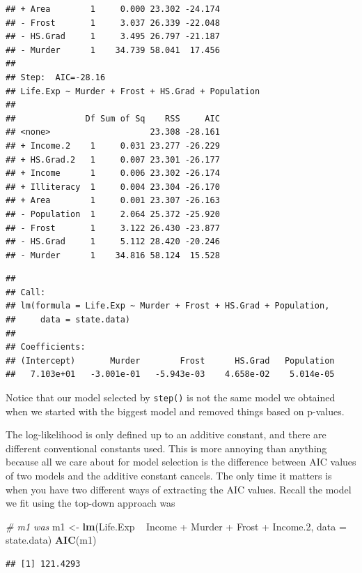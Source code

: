 \documentclass[]{book}
\newenvironment{Shaded}{\begin{snugshade}}{\end{snugshade}}
\newcommand{\KeywordTok}[1]{\textcolor[rgb]{0.13,0.29,0.53}{\textbf{{#1}}}}
\newcommand{\DataTypeTok}[1]{\textcolor[rgb]{0.13,0.29,0.53}{{#1}}}
\newcommand{\FloatTok}[1]{\textcolor[rgb]{0.00,0.00,0.81}{{#1}}}
\newcommand{\StringTok}[1]{\textcolor[rgb]{0.31,0.60,0.02}{{#1}}}
\newcommand{\CommentTok}[1]{\textcolor[rgb]{0.56,0.35,0.01}{\textit{{#1}}}}
\newcommand{\NormalTok}[1]{{#1}}
\theoremstyle{definition}
\theoremstyle{definition}
\theoremstyle{remark}
\begin{document}
\begin{verbatim}
## + Area        1     0.000 23.302 -24.174
## - Frost       1     3.037 26.339 -22.048
## - HS.Grad     1     3.495 26.797 -21.187
## - Murder      1    34.739 58.041  17.456
## 
## Step:  AIC=-28.16
## Life.Exp ~ Murder + Frost + HS.Grad + Population
## 
##              Df Sum of Sq    RSS     AIC
## <none>                    23.308 -28.161
## + Income.2    1     0.031 23.277 -26.229
## + HS.Grad.2   1     0.007 23.301 -26.177
## + Income      1     0.006 23.302 -26.174
## + Illiteracy  1     0.004 23.304 -26.170
## + Area        1     0.001 23.307 -26.163
## - Population  1     2.064 25.372 -25.920
## - Frost       1     3.122 26.430 -23.877
## - HS.Grad     1     5.112 28.420 -20.246
## - Murder      1    34.816 58.124  15.528
\end{verbatim}

\begin{verbatim}
## 
## Call:
## lm(formula = Life.Exp ~ Murder + Frost + HS.Grad + Population, 
##     data = state.data)
## 
## Coefficients:
## (Intercept)       Murder        Frost      HS.Grad   Population  
##   7.103e+01   -3.001e-01   -5.943e-03    4.658e-02    5.014e-05
\end{verbatim}

Notice that our model selected by \texttt{step()} is not the same model
we obtained when we started with the biggest model and removed things
based on p-values.

The log-likelihood is only defined up to an additive constant, and there
are different conventional constants used. This is more annoying than
anything because all we care about for model selection is the difference
between AIC values of two models and the additive constant cancels. The
only time it matters is when you have two different ways of extracting
the AIC values. Recall the model we fit using the top-down approach was

\begin{Shaded}
\begin{Highlighting}[]
\CommentTok{# m1 was}
\NormalTok{m1 <-}\StringTok{ }\KeywordTok{lm}\NormalTok{(Life.Exp ~}\StringTok{ }\NormalTok{Income +}\StringTok{ }\NormalTok{Murder +}\StringTok{ }\NormalTok{Frost +}\StringTok{ }\NormalTok{Income}\FloatTok{.2}\NormalTok{, }\DataTypeTok{data =} \NormalTok{state.data)}
\KeywordTok{AIC}\NormalTok{(m1)}
\end{Highlighting}
\end{Shaded}

\begin{verbatim}
## [1] 121.4293
\end{verbatim}
\end{document}
